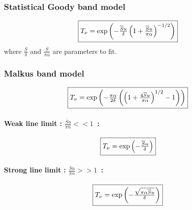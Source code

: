 \documentclass[a4paper]{article}
\begin{document}
{ 



\subsubsection{Statistical Goody band model}

\begin{equation}
\fbox{$
T_\nu=\exp\left( - \frac{\overline{S}u}{\delta}\left( 1+\frac{\overline{S}u}{\pi \alpha} \right)^{-1/2} \right)
$}
\end{equation}
where $\frac{\overline{S}}{\delta}$ and $\frac{\overline{S}}{\pi \alpha}$ are parameters to fit.

\subsubsection{Malkus band model}

\begin{equation}
\fbox{$
T_\nu=\exp \left(
 - \frac{\pi \alpha}{2\delta}\left( \left(1+\frac{4\overline{S}u}{\pi \alpha} \right)^{1/2}  -1\right)
 \right)
$}
\end{equation}

\paragraph{Weak line limit : $\frac{\overline{S}u}{\pi \alpha}<<1$~:}

\begin{equation}
\fbox{$
T_\nu=\exp \left(
 - \frac{\overline{S}u}{\delta}
 \right)
$}
\end{equation}


\paragraph{Strong line limit : $\frac{\overline{S}u}{\pi \alpha}>>1$~:}
\begin{equation}
\fbox{$
T_\nu=\exp \left(
 - \frac{\sqrt{\pi\alpha \overline{S}u}}{\delta}
 \right)
$}
\end{equation}

}  %
\end{document}
